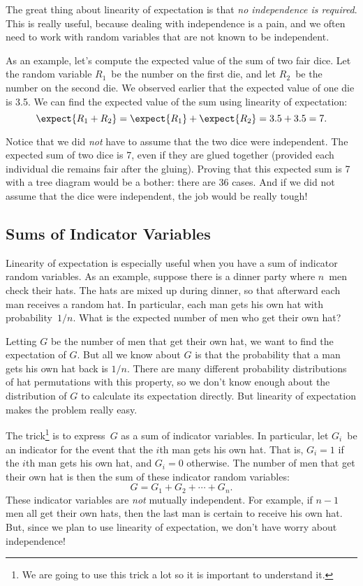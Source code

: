 The great thing about linearity of expectation is that \emph{no
independence is required}.  This is really useful, because dealing with
independence is a pain, and we often need to work with random variables
that are not known to be independent.

As an example, let's compute the expected value of the sum of two fair
dice.  Let the random variable $R_1$~be the number on the first die,
and let $R_2$~be the number on the second die.  We observed earlier
that the expected value of one die is 3.5.  We can find the expected
value of the sum using linearity of expectation:
\begin{equation*}
\expect{R_1 + R_2}
 =   \expect{R_1} + \expect{R_2}
 =    3.5 + 3.5
 =    7.
\end{equation*}

Notice that we did \emph{not} have to assume that the two dice were
independent.  The expected sum of two dice is 7, even if they are
glued together (provided each individual die remains fair after the
gluing).  Proving that this expected sum is 7 with a tree diagram
would be a bother: there are 36 cases.  And if we did not assume that
the dice were independent, the job would be really tough!

\subsection{Sums of Indicator Variables}\label{sec:hat_check}

Linearity of expectation is especially useful when you have a sum of
indicator random variables.  As an example, suppose there is a dinner
party where $n$~men check their hats.  The hats are mixed up during
dinner, so that afterward each man receives a random hat.  In
particular, each man gets his own hat with probability~$1/n$.  What is
the expected number of men who get their own hat?

Letting $G$ be the number of men that get their own hat, we want to find
the expectation of $G$.  But all we know about $G$ is that the probability
that a man gets his own hat back is $1/n$.  There are many different
probability distributions of hat permutations with this property, so we
don't know enough about the distribution of $G$ to calculate its
expectation directly.  But linearity of expectation makes the problem
really easy.

The trick\footnote{We are going to use this trick a lot so it is
  important to understand it.} is to express~$G$ as a sum of indicator
variables.  In particular, let $G_i$~be an indicator for the event
that the $i$th man gets his own hat.  That is, $G_i = 1$ if the $i$th
man gets his own hat, and $G_i = 0$ otherwise.  The number of men that
get their own hat is then the sum of these indicator random variables:
\begin{equation}\label{GG}
    G = G_1 + G_2 + \cdots + G_n.
\end{equation}
These indicator variables are \emph{not} mutually independent.  For
example, if $n-1$ men all get their own hats, then the last man is
certain to receive his own hat.  But, since we plan to use linearity
of expectation, we don't have worry about independence!

